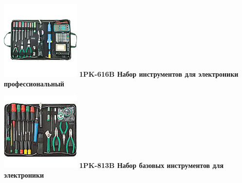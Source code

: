 \documentclass{magazine}
\begin{document}
{

\noindent\includegraphics[width=\columnwidth]{fig/00/pros/1PK-616B.jpg}
\textbf{1PK-616B Набор инструментов для электроники профессиональный}

\noindent\includegraphics[width=\columnwidth]{fig/00/pros/1PK-813B.jpg}
\textbf{1PK-813B Набор базовых инструментов для электроники}

}
\end{document}
